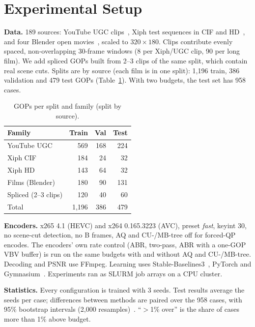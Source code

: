 \documentclass[conference]{IEEEtran}
\begin{document}
\section{Experimental Setup}\label{sec:setup}
\textbf{Data.} 189 sources: YouTube UGC clips~\cite{wang2019ugc}, Xiph test sequences in CIF and HD~\cite{xiph}, and four Blender open movies~\cite{blender}, scaled to $320{\times}180$. Clips contribute evenly spaced, non-overlapping 30-frame windows (8 per Xiph/UGC clip, 90 per long film). We add spliced GOPs built from 2--3 clips of the same split, which contain real scene cuts. Splits are by source (each film is in one split): 1{,}196 train, 386 validation and 479 test GOPs (Table~\ref{tab:data}). With two budgets, the test set has 958 cases.

\begin{table}[t]
\centering\footnotesize
\caption{GOPs per split and family (split by source).}
\label{tab:data}
\begin{tabular}{@{}lrrr@{}}
\toprule
Family & Train & Val & Test\\
\midrule
YouTube UGC & 569 & 168 & 224\\
Xiph CIF & 184 & 24 & 32\\
Xiph HD & 143 & 64 & 32\\
Films (Blender) & 180 & 90 & 131\\
Spliced (2--3 clips) & 120 & 40 & 60\\
\midrule
Total & 1{,}196 & 386 & 479\\
\bottomrule
\end{tabular}
\end{table}

\textbf{Encoders.} x265 4.1 (HEVC) and x264 0.165.3223 (AVC), preset \emph{fast}, keyint 30, no scene-cut detection, no B frames, AQ and CU-/MB-tree off for forced-QP encodes. The encoders' own rate control (ABR, two-pass, ABR with a one-GOP VBV buffer) is run on the same budgets with and without AQ and CU-/MB-tree. Decoding and PSNR use FFmpeg. Learning uses Stable-Baselines3~\cite{raffin2021sb3}, PyTorch and Gymnasium~\cite{towers2024gymnasium}. Experiments ran as SLURM job arrays on a CPU cluster.

\textbf{Statistics.} Every configuration is trained with 3 seeds. Test results average the seeds per case; differences between methods are paired over the 958 cases, with 95\% bootstrap intervals (2{,}000 resamples)~\cite{efron1993bootstrap}. ``$>$1\% over'' is the share of cases more than 1\% above budget.
\end{document}
